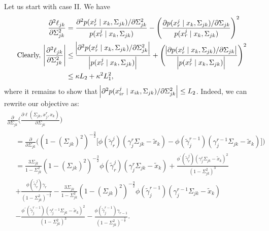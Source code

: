 \begin{condition}
    Let us start with case II. We have
    \begin{equation}\label{hessian_case2} 
        \begin{split}
            \frac{\partial^2\ell_{jk}}{\partial \Sigma_{jk}^{2}} &= \frac{\partial^2 p(x^j_{r} \mid x_{k}, \Sigma_{jk})/\partial \Sigma_{jk}^{2}}{p(x^j_{r} \mid x_{k}, \Sigma_{jk})} - \Bigg(\frac{\partial p(x^j_{r} \mid x_{k}, \Sigma_{jk}) / \partial \Sigma_{jk}}{p(x^j_{r} \mid x_{k}, \Sigma_{jk})}\Bigg)^2 \\
            \text{Clearly, } \abs{\frac{\partial^2\ell_{jk}}{\partial \Sigma_{jk}^{2}}} &\leq \frac{\abs{\partial^2 p(x^j_{r} \mid x_{k}, \Sigma_{jk})/\partial \Sigma_{jk}^{2}}}{\abs{p(x^j_{r} \mid x_{k}, \Sigma_{jk})}} + \Bigg( \frac{\abs{\partial p(x^j_{r} \mid x_{k}, \Sigma_{jk}) / \partial \Sigma_{jk}}}{\abs{p(x^j_{r} \mid x_{k}, \Sigma_{jk})}} \Bigg)^2 \\
            &\leq \kappa L_2 + \kappa^2 L_1^2,
        \end{split}
    \end{equation}
    where it remains to show that $\abs{\partial^2 p(x^j_{ir} \mid x_{ik}, \Sigma_{jk})/\partial \Sigma_{jk}^{2}} \leq L_2$. Indeed, we can rewrite our objective as:
    \begin{multline}\label{second_derivative_case2}
            \frac{\partial}{\partial \Sigma_{jk}} \Bigg(\frac{\partial\ell(\Sigma_{jk}, x_j^r,x_k)}{\partial \Sigma_{jk}}\Bigg) \\
            \begin{aligned}
            &= \frac{\partial}{\partial \Sigma_{jk}}\Bigg( (1-(\Sigma_{jk})^2)^{-\frac{3}{2}} \Bigg[\phi({\tilde{\gamma}}^j_{r})({\gamma}_j^r\Sigma_{jk} - {\tilde{x}}_{k}) - \phi({\tilde{\gamma}}_j^{r-1})({\gamma}_j^{r-1}\Sigma_{jk} - {\tilde{x}}_{k})\Bigg] \Bigg) \\
            &= \frac{3\Sigma_{jk}}{1-\Sigma_{jk}^2} (1-(\Sigma_{jk})^2)^{-\frac{3}{2}} \phi({\tilde{\gamma}}^j_{r})({\gamma}_j^r\Sigma_{jk} - {\tilde{x}}_{k}) + \frac{\phi^\prime({\tilde{\gamma}}^j_{r})({\gamma}_j^r\Sigma_{jk} - {\tilde{x}}_{k})^2}{(1-\Sigma_{jk}^2)^3} \\
            &+ \frac{\phi({\tilde{\gamma}}^j_{r}){\gamma}_{r}}{(1-\Sigma_{jk}^2)^{-\frac{3}{2}}} - \frac{3\Sigma_{jk}}{1-\Sigma_{jk}^2} (1-(\Sigma_{jk})^2)^{-\frac{3}{2}} \phi({\tilde{\gamma}}_j^{r-1})({\gamma}_j^{r-1}\Sigma_{jk} - {\tilde{x}}_{k}) \\
            &-  \frac{\phi^\prime({\tilde{\gamma}}_j^{r-1})({\gamma}_j^{r-1}\Sigma_{jk} - {\tilde{x}}_{k})^2}{(1-\Sigma_{jk}^2)^3} - \frac{\phi({\tilde{\gamma}}_j^{r-1}){\gamma}_{r-1}}{(1-\Sigma_{jk}^2)^{-\frac{3}{2}}}.

\end{aligned}
\end{multline}
\end{condition}
